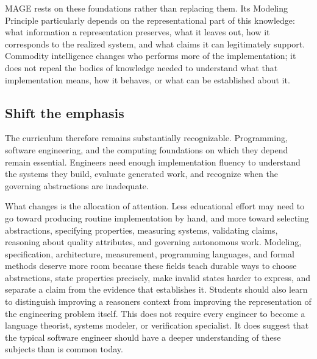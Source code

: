 
MAGE rests on these foundations rather than replacing them. Its Modeling Principle particularly depends on the representational part of this knowledge: what information a representation preserves, what it leaves out, how it corresponds to the realized system, and what claims it can legitimately support. Commodity intelligence changes who performs more of the implementation; it does not repeal the bodies of knowledge needed to understand what that implementation means, how it behaves, or what can be established about it.

\subsection{Shift the emphasis}\label{heading:shift-the-emphasis}


The curriculum therefore remains substantially recognizable. Programming, software engineering, and the computing foundations on which they depend remain essential. Engineers need enough implementation fluency to understand the systems they build, evaluate generated work, and recognize when the governing abstractions are inadequate.


What changes is the allocation of attention. Less educational effort may need to go toward producing routine implementation by hand, and more toward selecting abstractions, specifying properties, measuring systems, validating claims, reasoning about quality attributes, and governing autonomous work. Modeling, specification, architecture, measurement, programming languages, and formal methods deserve more room because these fields teach durable ways to choose abstractions, state properties precisely, make invalid states harder to express, and separate a claim from the evidence that establishes it. Students should also learn to distinguish improving a reasoner\textquotesingle s context from improving the representation of the engineering problem itself. This does not require every engineer to become a language theorist, systems modeler, or verification specialist. It does suggest that the typical software engineer should have a deeper understanding of these subjects than is common today.

